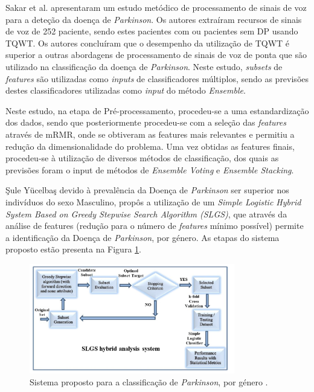\documentclass[12pt,a4paper,twoside]{report}
\begin{document}
{Sakar et al. \cite{SAKAR2019255} apresentaram um estudo metódico de processamento de sinais de voz para a deteção da doença de \textit{Parkinson}. Os autores extraíram recursos de sinais de voz de 252 paciente, sendo estes pacientes com ou pacientes sem \gls{DP} usando \gls{TQWT}. Os autores concluíram que o desempenho da utilização de \gls{TQWT} é superior a outras abordagens de processamento de sinais de voz de ponta que são utilizado na classificação da doença de \textit{Parkinson}. Neste estudo, \textit{subsets} de \textit{features} são utilizadas como \textit{inputs} de classificadores múltiplos, sendo as previsões destes classificadores utilizadas como \textit{input} do método \textit{Ensemble}.

Neste estudo, na etapa de Pré-processamento, procedeu-se a uma estandardização dos dados, sendo que posteriormente procedeu-se com a seleção das \textit{features} através de \gls{mRMR}, onde se obtiveram as features mais relevantes e permitiu a redução da dimensionalidade do problema. Uma vez obtidas as features finais, procedeu-se à utilização de diversos métodos de classificação, dos quais as previsões foram o input de métodos de \textit{Ensemble Voting} e \textit{Ensemble Stacking}.

Şule Yücelbaş \cite{yucelbaslogistic} devido à prevalência da Doença de \textit{Parkinson} ser superior nos indivíduos do sexo Masculino, propôs a utilização de um \textit{Simple Logistic Hybrid System Based on Greedy
Stepwise Search Algorithm (SLGS)}, que através da análise de features (redução para o número de \textit{features} mínimo possível) permite a identificação da Doença de \textit{Parkinson}, por género. As etapas do sistema proposto estão presenta na Figura \ref{fig:yucelbaslogistic}.

\begin{figure}[H]
    \centering
    \includegraphics[width=0.8\textwidth]{imagens/yucelbaslogistic.png}
    \caption{Sistema proposto para a classificação de \textit{Parkinson}, por género \cite{yucelbaslogistic}.}
    \label{fig:yucelbaslogistic}
\end{figure}

}
\end{document}
